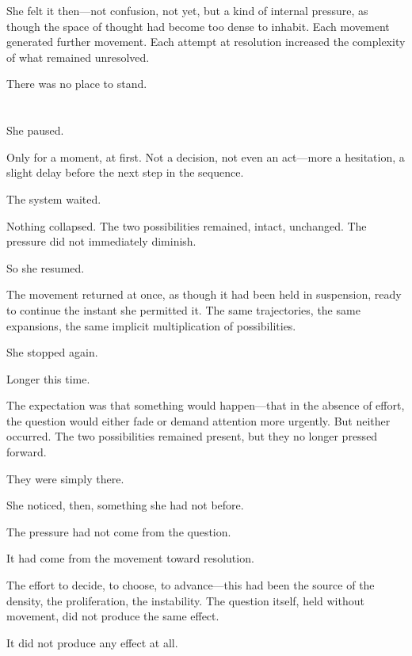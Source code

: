 She felt it then---not confusion, not yet, but a kind of internal
pressure, as though the space of thought had become too dense to
inhabit. Each movement generated further movement. Each attempt at
resolution increased the complexity of what remained unresolved.

There was no place to stand.

\section{}

She paused.

Only for a moment, at first. Not a decision, not even an act---more
a hesitation, a slight delay before the next step in the sequence.

The system waited.

Nothing collapsed. The two possibilities remained, intact,
unchanged. The pressure did not immediately diminish.

So she resumed.

The movement returned at once, as though it had been held in
suspension, ready to continue the instant she permitted it. The
same trajectories, the same expansions, the same implicit
multiplication of possibilities.

She stopped again.

Longer this time.

The expectation was that something would happen---that in the
absence of effort, the question would either fade or demand
attention more urgently. But neither occurred. The two
possibilities remained present, but they no longer pressed forward.

They were simply there.

She noticed, then, something she had not before.

The pressure had not come from the question.

It had come from the movement toward resolution.

The effort to decide, to choose, to advance---this had been the
source of the density, the proliferation, the instability. The
question itself, held without movement, did not produce the same
effect.

It did not produce any effect at all.

\section{}

